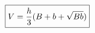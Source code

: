 \documentclass[preview]{standalone}
\begin{document}
\begin{align*}
\special{dvisvgm:raw <g id='unique000'>}\boxed{V=\frac{h}{3}(B+b+\sqrt{Bb})}\special{dvisvgm:raw </g>}
\end{align*}
\end{document}
